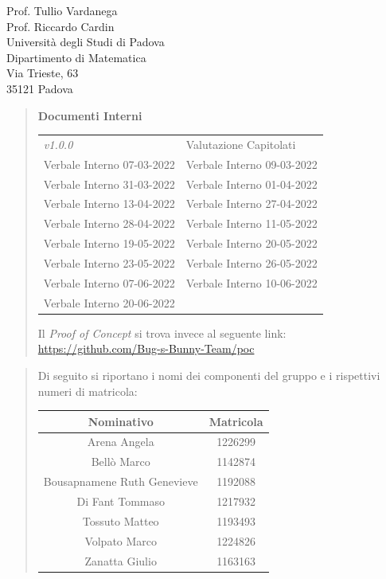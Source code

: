 \documentclass{articoletteracdp}
\begin{document}
\begin{letter}{
			Prof. Tullio Vardanega \\
			Prof. Riccardo Cardin \\
			Università degli Studi di Padova \\
			Dipartimento di Matematica \\
			Via Trieste, 63 \\
			35121 Padova
		}
\begin{quotation}
\begin{center}
				\vspace{0.5cm}
				\textbf{Documenti Interni}\\ \vspace{0.25cm}
				\begin{tabular}{L{4.2cm} | R{4.2cm}}
					\NdP{} \textit{v1.0.0} & Valutazione Capitolati \\
					Verbale Interno 07-03-2022 & Verbale Interno 09-03-2022 \\
					Verbale Interno 31-03-2022 & Verbale Interno 01-04-2022 \\					
					Verbale Interno 13-04-2022 & Verbale Interno 27-04-2022 \\
					Verbale Interno 28-04-2022 & Verbale Interno 11-05-2022 \\
					Verbale Interno 19-05-2022 & Verbale Interno 20-05-2022 \\
					Verbale Interno 23-05-2022 & Verbale Interno 26-05-2022 \\
					Verbale Interno 07-06-2022 & Verbale Interno 10-06-2022 \\
					Verbale Interno 20-06-2022 & \\
 					
				\end{tabular}
			\end{center}
            
			\noindent
			Il \textit{Proof of Concept} si trova invece al seguente link:\aCapo
			\href{https://github.com/Bug-s-Bunny-Team/poc}{https://github.com/Bug-s-Bunny-Team/poc}
        \end{quotation}

        \begin{quotation}
			\noindent
			Di seguito si riportano i nomi dei componenti del gruppo e i rispettivi numeri di matricola:

				\begin{center}
					\setlength{\extrarowheight}{.75ex}
					\begin{tabular}{ c | c }
						\textbf{Nominativo}           & \textbf{Matricola} \\
						\hline

						Arena Angela{}                & 1226299{}          \\
						Bellò Marco{}                 & 1142874{}          \\
						Bousapnamene Ruth Genevieve{} & 1192088{}          \\
						Di Fant Tommaso{}             & 1217932{}          \\
						Tossuto Matteo{}              & 1193493{}          \\
						Volpato Marco{}               & 1224826{}          \\
						Zanatta Giulio{}              & 1163163{}          \\


\end{tabular}
\end{center}
\end{quotation}
\end{letter}
\end{document}
